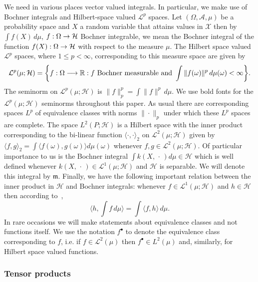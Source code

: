 \documentclass[AHL,Unicode,longabstracts,published]{cedram}
\theoremstyle{remark}
\newcommand{\R}{\mathbb{R}}
\newcommand{\X}{\mathcal{X}}
\newcommand{\clA}{\mathcal{A}}
\newcommand{\cH}{\mathcal{H}}
\newcommand{\clL}{\mathcal{L}}
\newcommand{\mean}{\mathfrak{m}}
\newcommand{\bn}{\bm{\|}}
\newcommand{\bl}{\bm{\langle}}
\newcommand{\br}{\bm{\rangle}_{2}}
\renewcommand*{\to}{\mathchoice{\longrightarrow}{\rightarrow}{\rightarrow}{\rightarrow}}
\let\originalleft\left
\let\originalright\right
\renewcommand{\left}{\mathopen{}\mathclose\bgroup\originalleft}
\renewcommand{\right}{\aftergroup\egroup\originalright}
\begin{document}
We need in various places vector valued integrals. In particular, we make use of Bochner integrals and Hilbert-space valued $\clL^p$ spaces. Let $(\Omega,\clA,\mu)$ be a probability space and $X$ a random variable that attains values in $\X$ then by $\int f(X) \,d\mu$, $f:\Omega \to \cH$ Bochner integrable, we mean the Bochner integral of the function $f(X) : \Omega \to \cH$ with respect to the measure $\mu$. The Hilbert space valued $\clL^p$ spaces, where $1\leq p < \infty$, corresponding to this measure space are given by
\[
\clL^p(\mu; \cH) = \left\{f: \Omega \to \R : f \text{ Bochner measurable and } \int \|f(\omega)\|^p \, d\mu(\omega) < \infty \right\}.
\]
The seminorm on $\clL^p(\mu;\cH)$ is $\bn f \bn_p^p = \int \|f\|^p \, d\mu$. We use bold fonts for the $\clL^p(\mu; \cH)$ seminorms throughout this paper. As usual there are corresponding spaces $L^p$ of equivalence classes with norms $\bn \cdot \bn_p$ under which these $L^p$ spaces are complete. The space $L^2(P;\cH)$ is a Hilbert space with the inner product corresponding to the bi-linear function $\bl \cdot, \cdot \br$ on $\clL^2(\mu;\cH)$ given by $\bl f,g \br = \int \langle f(\omega),g(\omega)\rangle d\mu(\omega)$ whenever $f,g \in \clL^2(\mu;\cH)$. Of particular importance to us is the Bochner integral $\int k(X,\,\cdot\,) d\mu \in \cH$ which is well defined whenever $k(X,\,\cdot\,) \in \clL^1(\mu;\cH)$ and $\cH$ is separable. We will denote this integral by $\mean$. Finally, we have the following important relation between the inner product in $\cH$ and Bochner integrals: whenever $f \in \clL^1(\mu;\cH)$ and $h\in \cH$ then according to~\cite[Theorem~6, p.~47]{DIES77},
\[
\langle h, \int f \, d\mu \rangle = \int \langle f,h\rangle \, d\mu.
\]
In rare occasions we will make statements about equivalence classes and not functions itself. We use the notation $f^\bullet$ to denote the equivalence class corresponding to $f$, i.e. if $f \in \clL^2(\mu)$ then $f^\bullet \in L^2(\mu)$ and, similarly, for Hilbert space valued functions.



\subsubsection{Tensor products}
\end{document}
